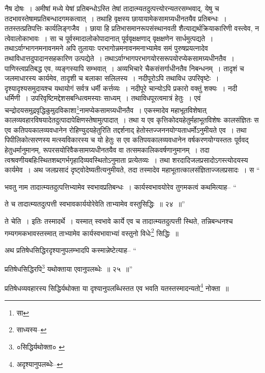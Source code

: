 \documentclass[article,12pt,a4paper]{memoir}
\begin{document}
	  \pstart नैष दोषः । अमीषां मध्ये येषां प्रतिबन्धोऽस्ति तेषां तादात्म्यतदुत्पत्त्योरन्यतरसम्भवाद्, येषु च तदभावस्तेषामप्रतिबन्धादगमकत्वात् । तथाहि वृक्षस्य छायायामेकसामग्र्यधीनतयैव प्रतिबन्धः । ततस्तत्प्रतिपत्तिः कार्यलिङ्गजैव । छाया हि प्रतिभासमानरूपसंस्थानवती शैत्याद्यर्थक्रियाकारिणी वस्त्वेव, न त्वेवालोकाभावः । सा च पूर्वस्मादालोकोपादानात् पूर्ववृक्षक्षणाद् वृक्षक्षणेन सार्धमुत्पद्यते । तथाऽर्वाग्भागनमनावनमने अपि तुलायाः परभागोन्नमनावनमनाभ्यामेव समं पुरुषप्रयत्नादेव तथाविधात्तदुपादानसह\leavevmode{}कारिण उत्पद्येते । तथाऽर्वाग्भागपरभागयोरसरूपयोरप्येकसामग्र्यधीनतैव । पाणिस्त्वप्रतिबद्ध एव, व्यङ्गस्यापि सम्भवात् । अव्यभिचारे चैकसंसर्गाधीनतैव निबन्धनम् । तादृशं च जलमाधारस्य कार्यमेव, तादृशी च बलाका सलिलस्य । नदीपूरोऽपि तथाविध उपरिवृष्टेः । दृश्यादृश्यसमुदायश्च यथायोगं सर्वत्र धर्मी कर्त्तव्यः । नदीपूरे चान्योऽपि प्रकारो वक्तुं शक्यः । नदी धर्मिणी । उपरिवृष्टिमद्देशसबन्धित्वमस्याः साध्यम् । तथाविधपूरत्वमात्रं हेतुः । एवं चन्द्रोदयसमुद्रवृद्धिकुमुदविकाशा\footnote{सा}\-नामप्येकसामग्र्यधीनतैव । एकस्मादेव महाभूतविशेषात् कालव्यवहारविषयादेतदुत्पादापेक्षिणस्तेषामुत्पादात् । तथा य एव कृत्तिकोदयहेतुर्महाभूतविशेषः कालसंज्ञितः स एव कतिपयकालव्यवधानेन रोहिण्युदयहेतुरिति तद्दर्शनाद् हेतोस्तज्जननयोग्यताधर्मोऽनुमीयते एव । तथा पिपीलिकोत्सरणस्य मत्स्यविकारस्य च यो हेतुः स एव कतिपयकालव्यवधानेन वर्षकरणयोग्यस्ततः पूर्ववद् हेतुधर्मानुमानम्, रूपरसयोरिवैकसामग्र्यधीनतयैव वा तत्समकालिकवर्षणानुमानम् । तदा त्वश्रवणीयबहिःस्थितशब्दगर्भगृहादिव्यवस्थितोऽनुमाता प्रत्येतव्यः । तथा शरदादिजलप्रसादोऽगस्त्योदयस्य कार्यमेव । अथ जलप्रसादं दृष्ट्वोदेष्यतीत्यनुमीयते, तदा तस्मादेव महाभूतात्कालसंज्ञिताज्जलप्रसादः । स \leavevmode{} “
	  
	भवतु नाम तादात्म्यतदुत्पत्तिभ्यामेव स्वभावप्रतिबन्धः । कार्यस्वभावयोरेव तुगमकत्वं कथमित्याह-- “
	  
	ते च तादात्म्यतदुत्पत्ती स्वभावकार्ययोरेवेति ताभ्यामेव वस्तुसिद्धिः ॥ २४ ॥” 
	  
	ते चेति । इतिः तस्मादर्थे । यस्मात् स्वभावे कार्ये एव च तादात्म्यतदुत्पत्ती स्थिते, तन्निबन्धनश्च गम्यगमकभावस्तस्मात् ताभ्यामेव कार्यस्वभावाभ्यां वस्तुनो विधेः\footnote{साध्यस्य--\cite{dp-msD-n}} सिद्धिः ॥ 
	  
	अथ प्रतिषेधसिद्धिरदृश्यानुपलम्भादपि कस्मान्नेष्टेत्याह-- “
	  
	प्रतिषेधसिद्धिरपि\footnote{०सिद्धिर्यथोक्ता० \cite{dp-edE}} यथोक्ताया एवानुपलब्धेः ॥ २५ ॥” 
	  
	प्रतिषेधव्यवहारस्य सिद्धिर्यथोक्ता या दृश्यानुपलब्धिस्तत एव भवति यतस्तस्मादन्यतो\footnote{अदृश्यानुपलब्धेः--\cite{dp-msD-n}} नोक्ता ॥ 
	  
\end{document}
